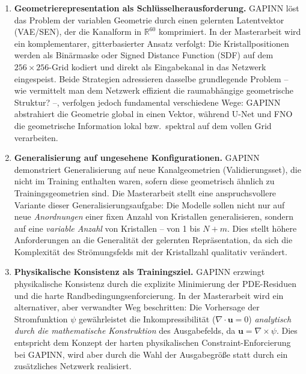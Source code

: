 \documentclass[a4paper,12pt]{article}
\begin{document}
\begin{enumerate}

\item \textbf{Geometrierepresentation als Schl\"usselherausforderung.}
GAPINN l\"ost das Problem der variablen Geometrie durch einen gelernten
Latentvektor (VAE/SEN), der die Kanalform in $\mathbb{R}^{60}$ komprimiert.
In der Masterarbeit wird ein komplementarer, gitterbasierter Ansatz verfolgt:
Die Kristallpositionen werden als Bin\"armaske oder Signed Distance Function
(SDF) auf dem $256 \times 256$-Grid kodiert und direkt als Eingabekanal
in das Netzwerk eingespeist. Beide Strategien adressieren dasselbe
grundlegende Problem -- wie vermittelt man dem Netzwerk effizient die
raumabh\"angige geometrische Struktur? --, verfolgen jedoch fundamental
verschiedene Wege: GAPINN abstrahiert die Geometrie global in einen
Vektor, w\"ahrend U-Net und FNO die geometrische Information lokal bzw.\
spektral auf dem vollen Grid verarbeiten.

\item \textbf{Generalisierung auf ungesehene Konfigurationen.}
GAPINN demonstriert Generalisierung auf neue Kanalgeometrien (Validierungsset),
die nicht im Training enthalten waren, sofern diese geometrisch \"ahnlich zu
Trainingsgeometrien sind. Die Masterarbeit stellt eine anspruchsvollere
Variante dieser Generalisierungsaufgabe: Die Modelle sollen nicht nur auf
neue \emph{Anordnungen} einer fixen Anzahl von Kristallen generalisieren,
sondern auf eine \emph{variable Anzahl} von Kristallen -- von 1 bis $N+m$.
Dies stellt h\"ohere Anforderungen an die Generalit\"at der gelernten
Repr\"asentation, da sich die Komplexit\"at des Str\"omungsfelds mit der
Kristallzahl qualitativ ver\"andert.

\item \textbf{Physikalische Konsistenz als Trainingsziel.}
GAPINN erzwingt physikalische Konsistenz durch die explizite Minimierung
der PDE-Residuen und die harte Randbedingungsenforcierung. In der Masterarbeit
wird ein alternativer, aber verwandter Weg beschritten: Die Vorhersage der
Stromfunktion $\psi$ gew\"ahrleistet die Inkompressibilit\"at
($\nabla \cdot \mathbf{u} = 0$) \emph{analytisch durch die mathematische
Konstruktion} des Ausgabefelds, da $\mathbf{u} = \nabla \times \psi$.
Dies entspricht dem Konzept der harten physikalischen Constraint-Enforcierung
bei GAPINN, wird aber durch die Wahl der Ausgabegr\"o\ss{}e statt durch ein
zus\"atzliches Netzwerk realisiert.


\end{enumerate}
\end{document}
